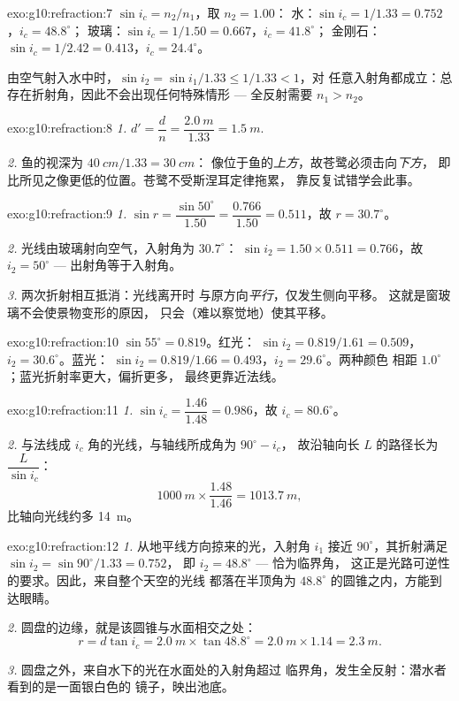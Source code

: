 \begin{solution}{exo:g10:refraction:7}
$\sin i_c = n_2/n_1$，取 $n_2 = 1.00$：
水：$\sin i_c = 1/1.33 = 0.752$，$i_c = 48.8^\circ$；
玻璃：$\sin i_c = 1/1.50 = 0.667$，$i_c = 41.8^\circ$；
金刚石：$\sin i_c = 1/2.42 = 0.413$，$i_c = 24.4^\circ$。

由空气射入水中时，$\sin i_2 = \sin i_1/1.33 \leq 1/1.33 < 1$，对
任意入射角都成立：总存在折射角，因此不会出现任何特殊情形 ---
全反射需要 $n_1 > n_2$。
\end{solution}

\begin{solution}{exo:g10:refraction:8}
\emph{1.} $d' = \dfrac{d}{n} = \dfrac{\qty{2.0}{m}}{1.33}
= \qty{1.5}{m}$.

\emph{2.} 鱼的视深为 $\qty{40}{cm}/1.33 = \qty{30}{cm}$：
像位于鱼的\emph{上方}，故苍鹭必须击向\emph{下方}，
即比所见之像更低的位置。苍鹭不受斯涅耳定律拖累，
靠反复试错学会此事。
\end{solution}

\begin{solution}{exo:g10:refraction:9}
\emph{1.} $\sin r = \dfrac{\sin 50^\circ}{1.50} = \dfrac{0.766}{1.50}
= 0.511$，故 $r = 30.7^\circ$。

\emph{2.} 光线由玻璃射向空气，入射角为 $30.7^\circ$：
$\sin i_2 = 1.50 \times 0.511 = 0.766$，故 $i_2 = 50^\circ$ ---
出射角等于入射角。

\emph{3.} 两次折射相互抵消：光线离开时
与原方向\emph{平行}，仅发生侧向平移。
这就是窗玻璃不会使景物变形的原因，
只会（难以察觉地）使其平移。
\end{solution}

\begin{solution}{exo:g10:refraction:10}
$\sin 55^\circ = 0.819$。红光：
$\sin i_2 = 0.819/1.61 = 0.509$，$i_2 = 30.6^\circ$。蓝光：
$\sin i_2 = 0.819/1.66 = 0.493$，$i_2 = 29.6^\circ$。两种颜色
相距 $1.0^\circ$；蓝光折射率更大，偏折更多，
最终更靠近法线。
\end{solution}

\begin{solution}{exo:g10:refraction:11}
\emph{1.} $\sin i_c = \dfrac{1.46}{1.48} = 0.986$，故
$i_c = 80.6^\circ$。

\emph{2.} 与法线成 $i_c$ 角的光线，与轴线所成角为 $90^\circ - i_c$，
故沿轴向长 $L$ 的路径长为 $\dfrac{L}{\sin i_c}$：
\[
\qty{1000}{m} \times \frac{1.48}{1.46} = \qty{1013.7}{m},
\]
比轴向光线约多 \qty{14}{m}。
\end{solution}

\begin{solution}{exo:g10:refraction:12}
\emph{1.} 从地平线方向掠来的光，入射角 $i_1$ 接近
$90^\circ$，其折射满足 $\sin i_2 = \sin 90^\circ / 1.33 = 0.752$，
即 $i_2 = 48.8^\circ$ --- 恰为临界角，
这正是光路可逆性的要求。因此，来自整个天空的光线
都落在半顶角为 $48.8^\circ$ 的圆锥之内，方能到达眼睛。

\emph{2.} 圆盘的边缘，就是该圆锥与水面相交之处：
\[
r = d \tan i_c = \qty{2.0}{m} \times \tan 48.8^\circ
= \qty{2.0}{m} \times 1.14 = \qty{2.3}{m}.
\]

\emph{3.} 圆盘之外，来自水下的光在水面处的入射角超过
临界角，发生全反射：潜水者看到的是一面银白色的
镜子，映出池底。
\end{solution}


